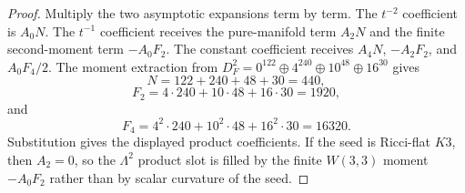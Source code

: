 \begin{proof}
Multiply the two asymptotic expansions term by term.  The $t^{-2}$ coefficient
is $A_0N$.  The $t^{-1}$ coefficient receives the pure-manifold term $A_2N$ and
the finite second-moment term $-A_0F_2$.  The constant coefficient receives
$A_4N$, $-A_2F_2$, and $A_0F_4/2$.  The moment extraction from
$D_F^2=0^{122}\oplus4^{240}\oplus10^{48}\oplus16^{30}$ gives
\[
  N=122+240+48+30=440,
\]
\[
  F_2=4\cdot240+10\cdot48+16\cdot30=1920,
\]
and
\[
  F_4=4^2\cdot240+10^2\cdot48+16^2\cdot30=16320.
\]
Substitution gives the displayed product coefficients.  If the seed is
Ricci-flat $K3$, then $A_2=0$, so the $\Lambda^2$ product slot is filled by the
finite $W(3,3)$ moment $-A_0F_2$ rather than by scalar curvature of the seed.
\end{proof}
